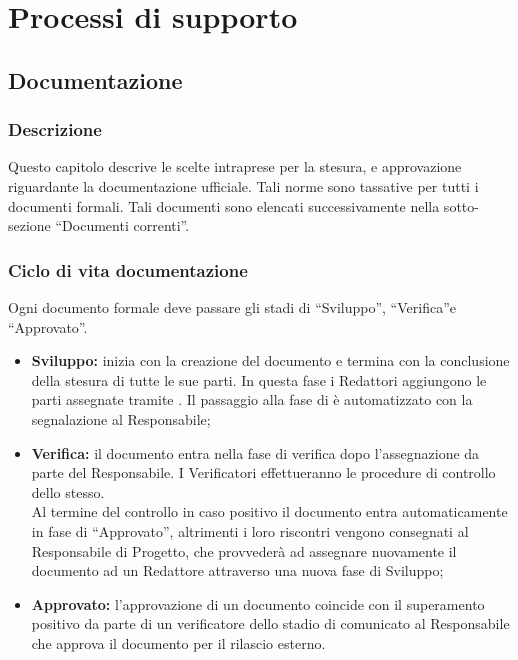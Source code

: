 \documentclass[NormeDiProgetto.tex]{subfiles}
\begin{document}
	
	\chapter{Processi di supporto}
	
	\section{Documentazione}
	\subsection{Descrizione}
	Questo capitolo descrive le scelte intraprese per la
	stesura,  e approvazione riguardante la documentazione ufficiale.
	Tali norme sono tassative per tutti i documenti formali.
	Tali documenti sono elencati successivamente nella sotto-sezione \textquotedblleft Documenti correnti\textquotedblright. 
	
	\subsection{Ciclo di vita documentazione}
	Ogni documento formale deve passare gli stadi di \textquotedblleft Sviluppo\textquotedblright, \textquotedblleft Verifica\textquotedblright e \textquotedblleft Approvato\textquotedblright.
	\begin{itemize}
		\item \textbf{Sviluppo:} inizia con la creazione del documento e termina con la conclusione della stesura di tutte le sue parti. In questa fase i Redattori aggiungono le parti assegnate tramite .
		Il passaggio alla fase di  è automatizzato con la segnalazione al Responsabile;
		
		\item \textbf{Verifica:} il documento entra nella fase di verifica dopo l'assegnazione da parte del Responsabile. I Verificatori effettueranno le procedure di controllo dello stesso.\\
		Al termine del controllo in caso positivo il documento entra automaticamente in fase di \textquotedblleft Approvato\textquotedblright, altrimenti i loro riscontri vengono consegnati al Responsabile di Progetto, che provvederà ad assegnare nuovamente il documento ad un Redattore attraverso una nuova fase di Sviluppo; 
		
		\item \textbf{Approvato:} l'approvazione di un documento coincide con il superamento positivo da parte di un verificatore dello stadio di  comunicato al Responsabile che approva il documento per il rilascio esterno.
	\end{itemize}
	
\end{document}
